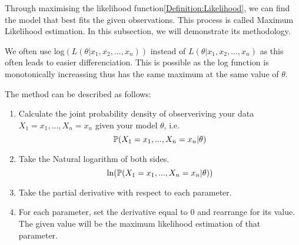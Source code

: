     Through maximising the likelihood function\ref{Definition:Likelihood}, we can find the model that best fits the given observations. This process is called Maximum Likelihood estimation. In this subsection, we will demonstrate its methodology.

    We often use log$(L(\theta|x_1, x_2,...,x_n))$ instead of $L(\theta|x_1, x_2,...,x_n)$ as this often leads to easier differenciation. This is possible as the log function is monotonically increassing thus has the same maximum at the same value of $\theta$.

    The method can be described as follows:
    \begin{enumerate}[i]
        \label{Model_Selection:Maximum_Liklihood_Estimators:MLE:Method}
        \item Calculate the joint probability density of observeriving your data $X_1 = x_1,...,X_n=x_n$ given your model $\theta$, i.e.
        \begin{equation}
            \mathbb{P}(X_1 = x_1,...,X_n=x_n|\theta)
        \end{equation}
        \item Take the Natural logarithm of both sides. 
        \begin{equation}
            \ln(\mathbb{P}(X_1 = x_1,...,X_n=x_n|\theta))
        \end{equation}
        \item Take the partial derivative with respect to each parameter.
        \item For each parameter, set the derivative equal to 0 and rearrange for its value. The given value will be the maximum likelihood estimation of that parameter.
    \end{enumerate}

